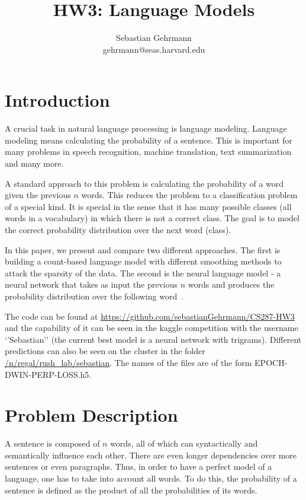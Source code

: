 \documentclass[11pt]{article}
\title{HW3: Language Models}
\author{Sebastian Gehrmann \\ gehrmann@seas.harvard.edu}
\begin{document}
\maketitle{}
\section{Introduction}

A crucial task in natural language processing is language modeling. Language modeling means calculating the probability of a sentence. This is important for many problems in speech recognition, machine translation, text summarization and many more. 

A standard approach to this problem is calculating the probability of a word given the previous $n$ words. 
This reduces the problem to a classification problem of a special kind. It is special in the sense that it has many possible classes (all words in a vocabulary) in which there is not a correct class. The goal is to model the correct probability distribution over the next word (class).


In this paper, we present and compare two different approaches. The first is building a count-based language model with different smoothing methods to attack the sparsity of the data. The second is the neural language model - a neural network that takes as input the previous $n$ words and produces the probability distribution over the following word~\citep{Bengio2003neural}.

The code can be found at \url{https://github.com/sebastianGehrmann/CS287-HW3} and the capability of it can be seen in the kaggle competition with the username `'Sebastian'' (the current best model is a neural network with trigrams). Different predictions can also be seen on the cluster in the folder \url{/n/regal/rush_lab/sebastian}. The names of the files are of the form EPOCH-DWIN-PERP-LOSS.h5.


\section{Problem Description}

A sentence is composed of $n$ words, all of which can syntactically and semantically influence each other. There are even longer dependencies over more sentences or even paragraphs. Thus, in order to have a perfect model of a language, one has to take into account all words. To do this, the probability of a sentence is defined as the product of all the probabilities of its words. 
\end{document}
